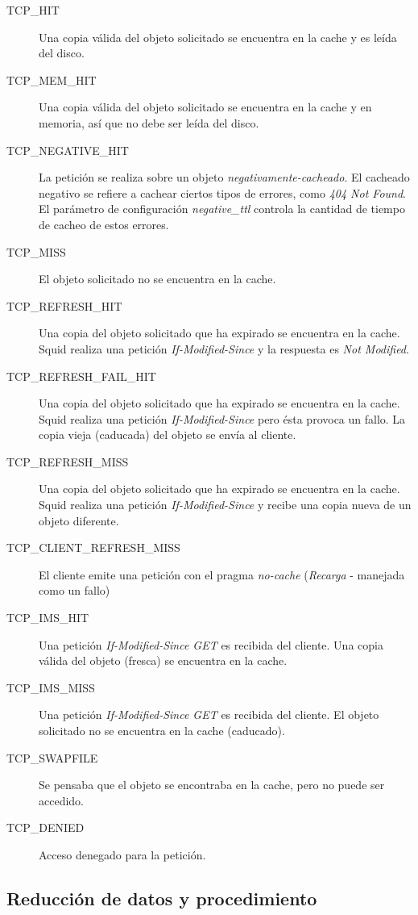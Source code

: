 \documentclass[twocolumn]{Jornadas}
\begin{document}
\begin{description}
\item[TCP\_HIT] Una copia válida del objeto solicitado se encuentra en la cache y es leída del disco.
\item[TCP\_MEM\_HIT] Una copia válida del objeto solicitado se encuentra en la cache y en memoria, así que no debe ser leída del disco.
\item[TCP\_NEGATIVE\_HIT] La petición se realiza sobre un objeto \emph{negativamente-cacheado}. El cacheado negativo se refiere a cachear ciertos tipos de errores, como \emph{404 Not Found}. El parámetro de configuración \emph{negative\_ttl} controla la cantidad de tiempo de cacheo de estos errores.
\item[TCP\_MISS] El objeto solicitado no se encuentra en la cache.
\item[TCP\_REFRESH\_HIT] Una copia del objeto solicitado que ha expirado se encuentra en la cache. Squid realiza una petición \emph{If-Modified-Since} y la respuesta es \emph{Not Modified}.
\item[TCP\_REFRESH\_FAIL\_HIT] Una copia del objeto solicitado que ha expirado se encuentra en la cache. Squid realiza una petición \emph{If-Modified-Since} pero ésta provoca un fallo. La copia vieja (caducada) del objeto se envía al cliente.
\item[TCP\_REFRESH\_MISS] Una copia del objeto solicitado que ha expirado se encuentra en la cache. Squid realiza una petición \emph{If-Modified-Since} y recibe una copia nueva de un objeto diferente.
\item[TCP\_CLIENT\_REFRESH\_MISS] El cliente emite una petición con el pragma \emph{no-cache} (\emph{Recarga} - manejada como un fallo)
\item[TCP\_IMS\_HIT] Una petición \emph{If-Modified-Since GET} es recibida del cliente. Una copia válida del objeto (fresca) se encuentra en la cache.
\item[TCP\_IMS\_MISS] Una petición \emph{If-Modified-Since GET} es recibida del cliente. El objeto solicitado no se encuentra en la cache (caducado).
\item[TCP\_SWAPFILE] Se pensaba que el objeto se encontraba en la cache, pero no puede ser accedido.
\item[TCP\_DENIED] Acceso denegado para la petición.
\end{description}

\subsection{Reducción de datos y procedimiento}
\label{red_datos}
\end{document}
